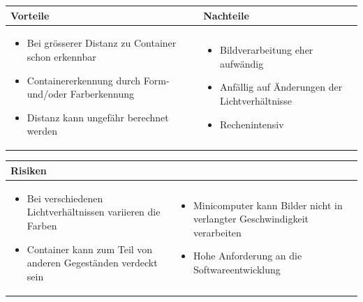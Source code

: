 \begin{table}[h]
\begin{tabular}{p{} | p{}}


\textbf{Vorteile} & \textbf{Nachteile} \\ \hline
	 
\begin{itemize}
\item Bei grösserer Distanz zu Container schon erkennbar
\item Containererkennung durch Form- und/oder Farberkennung
\item Distanz kann ungefähr berechnet werden
\end{itemize}

 
 &
 
\begin{itemize}
\item Bildverarbeitung eher aufwändig
\item Anfällig auf Änderungen der Lichtverhältnisse
\item Rechenintensiv
\end{itemize}

\end{tabular}
\end{table}

\begin{table}[h]
\begin{tabular}{p{}p{}}

\textbf{Risiken} & \\ \hline
	 
\begin{itemize}
\item Bei verschiedenen Lichtverhältnissen variieren die Farben
\item Container kann zum Teil von anderen Gegeständen verdeckt sein
\end{itemize}
&
\begin{itemize}
\item Minicomputer kann Bilder nicht in verlangter Geschwindigkeit verarbeiten
\item Hohe Anforderung an die Softwareentwicklung
\end{itemize}
\end{tabular}
\end{table}

\pagebreak